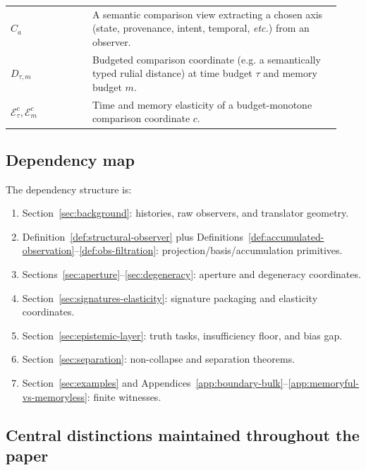 \documentclass[11pt,twoside]{article}
\theoremstyle{definition}
\begin{document}
\begin{center}
\begin{tabular}{p{0.23\linewidth} p{0.70\linewidth}}
\(C_a\) &
A semantic comparison view extracting a chosen axis (state, provenance, intent, temporal, \emph{etc.}) from an observer. \\[4pt]

\(D_{\tau,m}\) &
Budgeted comparison coordinate (e.g. a semantically typed rulial distance) at time budget \(\tau\) and memory budget \(m\). \\[4pt]

\(\mathcal{E}^{c}_{\tau},\mathcal{E}^{c}_{m}\) &
Time and memory elasticity of a budget-monotone comparison coordinate \(c\). \\

\bottomrule
\end{tabular}
\end{center}
\endgroup

\clearpage
\subsection{Dependency map}
\label{app:dependency-map}

The dependency structure is:
\begin{enumerate}[leftmargin=*]
  \item Section~\ref{sec:background}: histories, raw observers, and translator geometry.
  \item Definition~\ref{def:structural-observer} plus Definitions~\ref{def:accumulated-observation}--\ref{def:obs-filtration}: projection/basis/accumulation primitives.
  \item Sections~\ref{sec:aperture}--\ref{sec:degeneracy}: aperture and degeneracy coordinates.
  \item Section~\ref{sec:signatures-elasticity}: signature packaging and elasticity coordinates.
  \item Section~\ref{sec:epistemic-layer}: truth tasks, insufficiency floor, and bias gap.
  \item Section~\ref{sec:separation}: non-collapse and separation theorems.
  \item Section~\ref{sec:examples} and Appendices~\ref{app:boundary-bulk}--\ref{app:memoryful-vs-memoryless}: finite witnesses.
\end{enumerate}

\subsection{Central distinctions maintained throughout the paper}
\label{app:central-distinctions}
\end{document}
